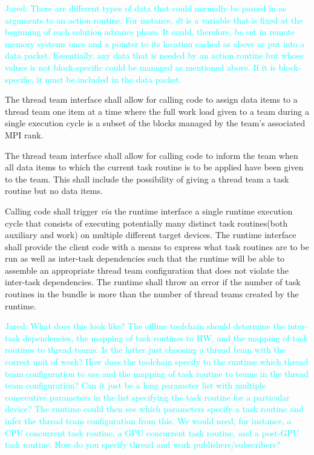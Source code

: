 \documentclass{article}
\newcommand{\Jared}[1]          {\textcolor{cyan}{Jared: #1}}
\newcommand{\taskroutine}        {task routine\xspace}
\newcommand{\taskroutines}       {task routines\xspace}
\begin{document}
\Jared{There are different types of data that could normally be passed in as
arguments to an action routine.  For instance, $dt$ is a variable that is fixed
at the beginning of each solution advance phase.  It could, therefore, be set
in remote memory systems once and a pointer to its location cached as above or
put into a data packet.  Essentially, any data that is needed by an action
routine but whose values is not block-specific could be managed as mentioned
above.  If it is block-specific, it must be included in the data packet.}

\begin{req}
The thread team interface shall allow for calling code to assign data items
to a thread team one item at a time where the full work load given to a
team during a single execution cycle is a subset of the blocks managed by the
team's associated MPI rank.
\end{req}

\begin{req}
The thread team interface shall allow for calling code to inform the team when
all data items to which the current \taskroutine is to be applied have been given to
the team.  This shall include the possibility of giving a thread team a \taskroutine but
no data items.
\end{req}

\begin{req}
Calling code shall trigger \textit{via} the runtime interface a single runtime
execution cycle that consists of executing potentially many distinct \taskroutines (both
auxiliary and work) on multiple different target devices.  The runtime interface
shall provide the client code with a means to express what \taskroutines are to be run
as well as inter-task dependencies such that the runtime will be able to
assemble an appropriate thread team configuration that does not violate the
inter-task dependencies.  The runtime shall throw an error if the number of
\taskroutines in the bundle is more than the number of thread teams created by the
runtime.
\end{req}

\Jared{What does this look like?  The offline toolchain should
determine the inter-task dependencies, the mapping of \taskroutines to HW, and the
mapping of \taskroutines to thread teams.  Is the latter just choosing a thread team
with the correct unit of work?  How does the toolchain specify to the runtime
which thread team configuration to use and the mapping of \taskroutine to teams in the
thread team configuration?  Can it just be a long parameter list with multiple
consecutive parameters in the list specifying the \taskroutine for a particular device?
The runtime could then see which parameters specify a \taskroutine and infer the thread
team configuration from this.  We would need, for instance, a CPU concurrent
\taskroutine, a GPU concurrent \taskroutine, and a post-GPU \taskroutine.  How do you specify thread and
work publishers/subscribers?}
\end{document}
